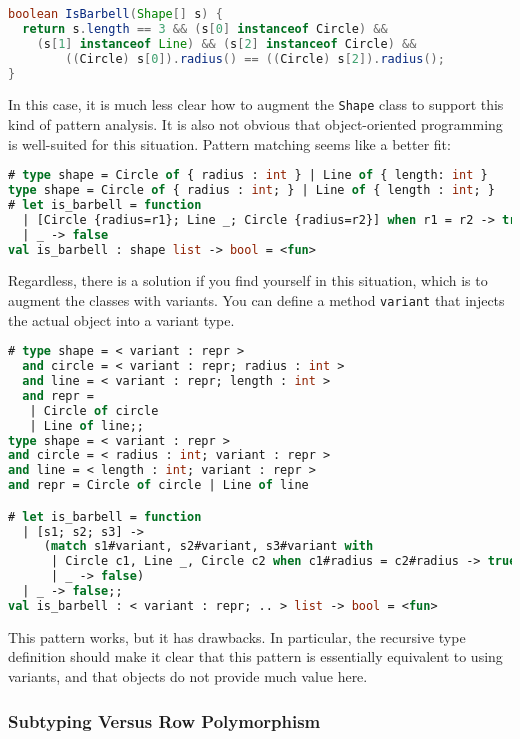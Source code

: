 \begin{lstlisting}[language=Java]
boolean IsBarbell(Shape[] s) {
  return s.length == 3 && (s[0] instanceof Circle) &&
    (s[1] instanceof Line) && (s[2] instanceof Circle) &&
        ((Circle) s[0]).radius() == ((Circle) s[2]).radius();
}
\end{lstlisting}

In this case, it is much less clear how to augment the
\passthrough{\lstinline!Shape!} class to support this kind of pattern
analysis. It is also not obvious that object-oriented programming is
well-suited for this situation. Pattern matching seems like a better
fit:

\begin{lstlisting}[language=Caml]
# type shape = Circle of { radius : int } | Line of { length: int }
type shape = Circle of { radius : int; } | Line of { length : int; }
# let is_barbell = function
  | [Circle {radius=r1}; Line _; Circle {radius=r2}] when r1 = r2 -> true
  | _ -> false
val is_barbell : shape list -> bool = <fun>
\end{lstlisting}

Regardless, there is a solution if you find yourself in this situation,
which is to augment the classes with variants. You can define a method
\passthrough{\lstinline!variant!} that injects the actual object into a
variant type.

\begin{lstlisting}[language=Caml]
# type shape = < variant : repr >
  and circle = < variant : repr; radius : int >
  and line = < variant : repr; length : int >
  and repr =
   | Circle of circle
   | Line of line;;
type shape = < variant : repr >
and circle = < radius : int; variant : repr >
and line = < length : int; variant : repr >
and repr = Circle of circle | Line of line

# let is_barbell = function
  | [s1; s2; s3] ->
     (match s1#variant, s2#variant, s3#variant with
      | Circle c1, Line _, Circle c2 when c1#radius = c2#radius -> true
      | _ -> false)
  | _ -> false;;
val is_barbell : < variant : repr; .. > list -> bool = <fun>
\end{lstlisting}

This pattern works, but it has drawbacks. In particular, the recursive
type definition should make it clear that this pattern is essentially
equivalent to using variants, and that objects do not provide much value
here.

\hypertarget{subtyping-vs.-row-polymorphism}{%
\subsubsection{Subtyping Versus Row
Polymorphism}\label{subtyping-vs.-row-polymorphism}}

